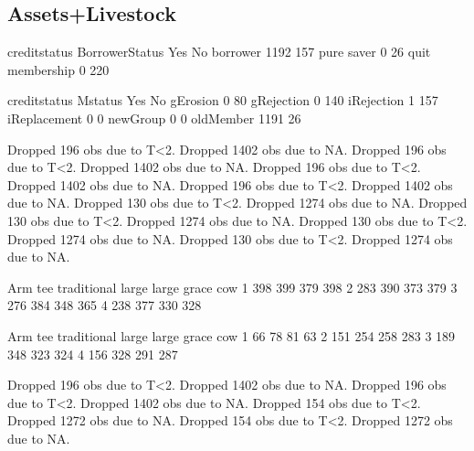 \subsection{Assets+Livestock}




\begin{Schunk}
\begin{Soutput}
                 creditstatus
BorrowerStatus     Yes   No
  borrower        1192  157
  pure saver         0   26
  quit membership    0  220
\end{Soutput}
\begin{Soutput}
              creditstatus
Mstatus         Yes   No
  gErosion        0   80
  gRejection      0  140
  iRejection      1  157
  iReplacement    0    0
  newGroup        0    0
  oldMember    1191   26
\end{Soutput}
\begin{Soutput}
Dropped 196 obs due to T<2.
Dropped 1402 obs due to NA.
Dropped 196 obs due to T<2.
Dropped 1402 obs due to NA.
Dropped 196 obs due to T<2.
Dropped 1402 obs due to NA.
Dropped 196 obs due to T<2.
Dropped 1402 obs due to NA.
Dropped 130 obs due to T<2.
Dropped 1274 obs due to NA.
Dropped 130 obs due to T<2.
Dropped 1274 obs due to NA.
Dropped 130 obs due to T<2.
Dropped 1274 obs due to NA.
Dropped 130 obs due to T<2.
Dropped 1274 obs due to NA.
\end{Soutput}
\end{Schunk}

\begin{Schunk}
\begin{Soutput}
   Arm
tee traditional large large grace cow
  1         398   399         379 398
  2         283   390         373 379
  3         276   384         348 365
  4         238   377         330 328
\end{Soutput}
\begin{Soutput}
   Arm
tee traditional large large grace cow
  1          66    78          81  63
  2         151   254         258 283
  3         189   348         323 324
  4         156   328         291 287
\end{Soutput}
\begin{Soutput}
Dropped 196 obs due to T<2.
Dropped 1402 obs due to NA.
Dropped 196 obs due to T<2.
Dropped 1402 obs due to NA.
Dropped 154 obs due to T<2.
Dropped 1272 obs due to NA.
Dropped 154 obs due to T<2.
Dropped 1272 obs due to NA.
\end{Soutput}
\end{Schunk}

